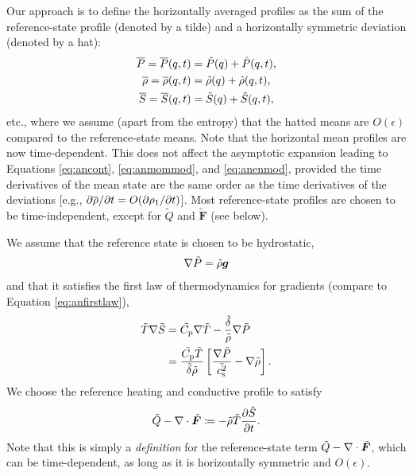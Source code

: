 \documentclass[12pt]{article}
\newcommand{\vecf}{\bm{F}}
\begin{document}
Our approach is to define the horizontally averaged profiles as the sum of the reference-state profile (denoted by a tilde) and a horizontally symmetric deviation (denoted by a hat):
\begin{align}
\overline{P}=	\overline{P}(q,t) &= \tilde{P}(q) + \hat{P}(q,t) ,\\
\overline{\rho}=	\overline{\rho}(q,t)  &= \tilde{\rho}(q)  + \hat{\rho}(q,t) ,\\
	\overline{S} = \overline{S} (q,t) &=  \tilde{S}(q)  + \hat{S}(q,t) ,
\end{align}
etc., where we assume (apart from the entropy) that the hatted means are $O(\epsilon)$ compared to the reference-state means. Note that the horizontal mean profiles are now time-dependent. This does not affect the asymptotic expansion leading to Equations \eqref{eq:ancont}, \eqref{eq:anmommod}, and \eqref{eq:anenmod}, provided the time derivatives of the mean state are the same order as the time derivatives of the deviations [e.g., $\partial\overline{\rho}/\partial t=O(\partial\rho_1/\partial t)$]. Most reference-state profiles are chosen to be time-independent, except for $\tilde{Q}$ and $\tilde{\vecf}$ (see below). 

We assume that the reference state is chosen to be hydrostatic,
\begin{align}\label{eq:refhydro}
	\nabla \tilde{P} = \tilde{\rho}\bm{g}
\end{align}
and that it satisfies the first law of thermodynamics for gradients (compare to Equation \eqref{eq:anfirstlaw}),
\begin{subequations}\label{eq:anfirstlawref}
	\begin{align}
		\tilde{T}\nabla\tilde{S} &= \tilde{C_{\rm{p}}}\nabla\tilde{T} - \frac{\tilde{\delta}}{\tilde{\rho}}\nabla\tilde{P} \\
		&= \frac{\tilde{C_{\rm{p}}}\tilde{T}}{\tilde{\delta}\tilde{\rho}}\left[\frac{\nabla\tilde{P}}{\tilde{c_{\rm s}^2}}-\nabla\tilde{\rho}\right].
	\end{align}
\end{subequations}
We choose the reference heating and conductive profile to satisfy
\begin{align}\label{eq:dsdt}
	\tilde{Q} - \Div\tilde{\vecf} \define -\rhotilde\tilde{T}\pderiv{\entrhat}{t}.
\end{align}
Note that this is simply a \textit{definition} for the reference-state term $\tilde{Q}-\Div\tilde{\vecf}$, which can be time-dependent, as long as it is horizontally symmetric and $O(\epsilon)$.
\end{document}
